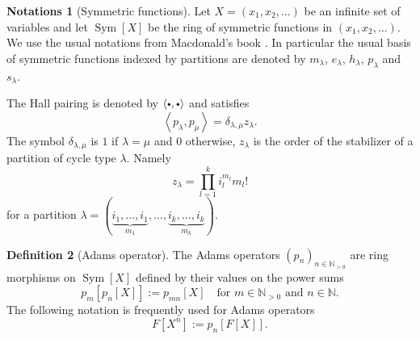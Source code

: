 \documentclass[11pt]{article}
\newcommand{\sbullet}{{\scriptscriptstyle\bullet}}
\newcommand{\csbullet}{{\raisebox{1pt}{$\sbullet$}}}
\theoremstyle{definition}
\newtheorem{definition}{Definition}[section]
\newtheorem{notations}[definition]{Notations}
\theoremstyle{plain}
\DeclareMathOperator{\SymF}{Sym}
\newcommand{\NN}{\mathbb N}
\begin{document}
\begin{notations}[Symmetric functions]
Let $X=(x_1,x_2,\dots)$ be an infinite set of variables and let $\SymF[X]$ be the ring of symmetric functions in $(x_1,x_2,\dots)$. We use the usual notations from Macdonald's book \cite{Macdonald}. In particular the usual basis of symmetric functions indexed by partitions are denoted by $m_{\lambda}$, $e_{\lambda}$, $h_{\lambda}$, $p_{\lambda}$ and $s_{\lambda}$.

The Hall pairing is denoted by $\langle\csbullet,\csbullet\rangle$ and satisfies
\begin{equation}\label{orthp}
\left\langle p_\lambda,p_\mu\right\rangle =\delta_{\lambda,\mu}z_\lambda.
\end{equation}
The symbol $\delta_{\lambda,\mu}$ is $1$ if $\lambda=\mu$ and $0$ otherwise, $z_\lambda$ is the order of the stabilizer of a partition of cycle type $\lambda$. Namely
\begin{equation*}
z_\lambda=\prod_{l=1}^k i_l^{m_{l}}m_{l}!
\end{equation*}
for a partition $\lambda=(\underbrace{i_1,\dots,i_1}_{m_{1}},\dots,\underbrace{i_k,\dots,i_k}_{m_{k}})$.
\end{notations}

\begin{definition}[Adams operator]
The Adams operators $(p_n)_{n\in\mathbb{N}_{>0}}$ are ring morphisms on $\SymF[X]$ defined by their values on the power sums
\[
p_m\left[p_n[X]\right]:=p_{mn}[X]\quad\text{for } m \in \NN_{>0} \text{ and } n \in \NN.
\]
The following notation is frequently used for Adams operators
\[
F\left[X^n\right]:=p_n\left[F[X]\right].
\]
\end{definition}
\end{document}
